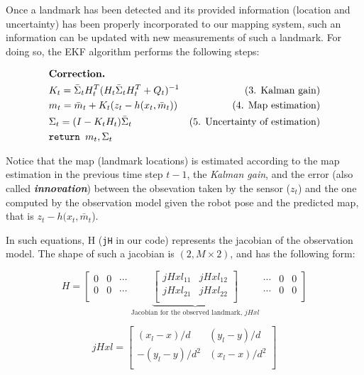\documentclass[11pt]{article}
\begin{document}
Once a landmark has been detected and its provided information (location
and uncertainty) has been properly incorporated to our mapping system,
such an information can be updated with new measurements of such a
landmark. For doing so, the EKF algorithm performs the following steps:

\[
  \begin{aligned}     
      & \textbf{Correction.} \\
      & K_t = \bar\Sigma_t H^T_t (H_t \bar\Sigma_t H^T_t + Q_t)^{-1} &\text{(3. Kalman gain)}\\
      & m_t = \bar m_t + K_t (z_t - h(x_t,\bar m_t)) &\text{(4. Map estimation)}\\
      & \Sigma_t = (I - K_t H_t) \bar\Sigma_t &\text{(5. Uncertainty of estimation)}\\
      & \verb!return ! m_t, \Sigma_t
  \end{aligned}
\]

Notice that the map (landmark locations) is estimated according to the
map estimation in the previous time step \(t-1\), the \emph{Kalman
gain}, and the error (also called \textbf{\emph{innovation}}) between
the obsevation taken by the sensor (\(z_t\)) and the one computed by the
observation model given the robot pose and the predicted map, that is
\(z_t - h(x_t,\bar m_t\)).

In such equations, H (\texttt{jH} in our code) represents the jacobian
of the observation model. The shape of such a jacobian is
\((2,M\times2)\), and has the following form:

\[
H = \left[
  \begin{matrix}
0 & 0 & \cdots \\
0 & 0 & \cdots \\
\end{matrix}
\right .
\underbrace{\begin{bmatrix}
jHxl_{11} & jHxl_{12} \\
jHxl_{21} & jHxl_{22} \\
\end{bmatrix}}_\text{Jacobian for the observed landmark, $jHxl$}
\left .
\begin{matrix}
\cdots & 0 & 0 \\
\cdots & 0 & 0 \\
\end{matrix}
\right]
\]

\[
jHxl = 
\begin{bmatrix}
(x_l - x)/d & (y_l - y)/d \\
-(y_l - y)/d^2 & (x_l - x)/d^2 \\
\end{bmatrix}
\]
\end{document}

